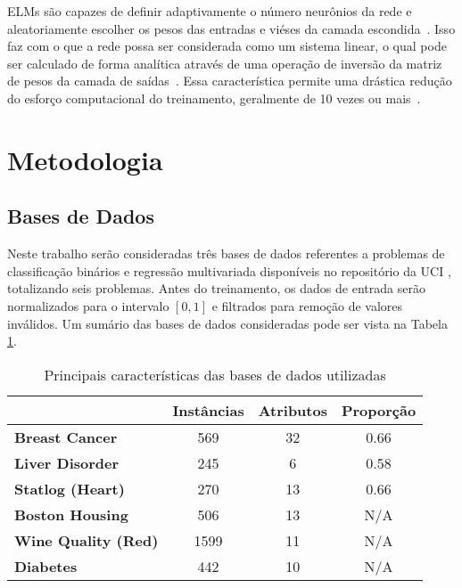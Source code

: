 \documentclass[conference]{IEEEtran}
\begin{document}
	ELMs são capazes de definir adaptivamente o número neurônios da rede e aleatoriamente escolher os pesos das entradas e viéses da camada escondida~\cite{huang2006extreme}. Isso faz com o que a rede possa ser considerada como um sistema linear, o qual pode ser calculado de forma analítica através de uma operação de inversão da matriz de pesos da camada de saídas~\cite{huang2006extreme}. Essa característica permite uma drástica redução do esforço computacional do treinamento, geralmente de 10 vezes ou mais~\cite{deng2010research}. 
	
	\section{Metodologia}
	\subsection{Bases de Dados}
	Neste trabalho serão consideradas três bases de dados referentes a problemas de classificação binários e regressão multivariada disponíveis no repositório da UCI \cite{dua2019}, totalizando seis problemas. Antes do treinamento, os dados de entrada serão normalizados para o intervalo $[0,1]$ e filtrados para remoção de valores inválidos. Um sumário das bases de dados consideradas pode ser vista na Tabela \ref{tab:datasets}.
	
	\begin{table}[thpbh]
		\caption{Principais características das bases de dados utilizadas}
		\label{tab:datasets}
		\centering
		\begin{tabular}{l|c|c|c|}
			\cline{2-4}
			& \textbf{Instâncias} & \textbf{Atributos} & \textbf{Proporção} \\ \hline
			\multicolumn{1}{|l|}{\textbf{Breast Cancer}}   & 569                 & 32                 & 0.66                           \\ \hline
			\multicolumn{1}{|l|}{\textbf{Liver Disorder}}  & 245                 & 6                  & 0.58                           \\ \hline
			\multicolumn{1}{|l|}{\textbf{Statlog (Heart)}} & 270                 & 13                 & 0.66                           \\ \hline
			\multicolumn{1}{|l|}{\textbf{Boston Housing}}  & 506                 & 13                 & N/A                            \\ \hline
			\multicolumn{1}{|l|}{\textbf{Wine Quality (Red)}}      & 1599                 & 11                 & N/A                            \\ \hline
			\multicolumn{1}{|l|}{\textbf{Diabetes}}        & 442                 & 10                 & N/A                            \\ \hline
		\end{tabular}
	\end{table}
	
\end{document}
